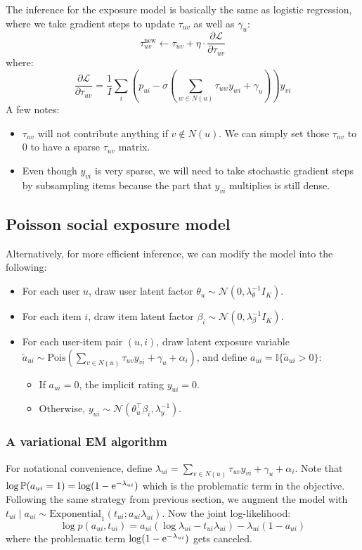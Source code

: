 The inference for the exposure model is basically the same as logistic regression, where we take gradient steps to update $\tau_{uv}$ as well as $\gamma_u$:
\[
\textstyle\tau_{uv}^\text{new} \leftarrow \tau_{uv} + \eta \cdot \frac{\partial \mathcal{L}}{\partial \tau_{uv}}
\]
where:
\[
\textstyle\frac{\partial \mathcal{L}}{\partial \tau_{uv}} = \frac{1}{I}\sum_i (p_{ui} - \sigma(\sum_{w\in N(u)} \tau_{uw} y_{wi} + \gamma_u)) y_{vi}
\] 
A few notes:
\begin{itemize}
\item $\tau_{uv}$ will not contribute anything if $v \notin N(u)$. We can simply set those $\tau_{uv}$ to $0$ to have a sparse $\tau_{uv}$ matrix.
\item Even though $y_{vi}$ is very sparse, we will need to take stochastic gradient steps by subsampling items because the part that $y_{vi}$ multiplies is still dense. 
\end{itemize}

\subsection*{Poisson social exposure model} Alternatively, for more efficient inference, we can modify the model into the following:
\begin{itemize}
\item For each user $u$, draw user latent factor $\theta_{u} \sim \mathcal{N}(0, \lambda_\theta^{-1} I_K)$.
\item For each item $i$, draw item latent factor $\beta_{i} \sim \mathcal{N}(0, \lambda_\beta^{-1} I_K)$.
\item For each user-item pair $(u, i)$, draw latent exposure variable $\tilde{a}_{ui} \sim \text{Pois}(\sum_{v\in N(u)} \tau_{uv} y_{vi} + \gamma_u + \alpha_i)$, and define $a_{ui} = \mathbb{I}\{\tilde{a}_{ui} > 0\}$:
\begin{itemize}
\item If $a_{ui} = 0$, the implicit rating $y_{ui} = 0$.
\item Otherwise, $y_{ui} \sim \mathcal{N}(\theta_u^\top\beta_i, \lambda_y^{-1})$.
\end{itemize}
\end{itemize}

\subsubsection*{A variational EM algorithm}
For notational convenience, define $\lambda_{ui} = \sum_{v\in N(u)} \tau_{uv} y_{vi} + \gamma_u + \alpha_i$. Note that $\log \mathbb{P}(a_{ui} = 1) = \log (1 - \mathrm{e}^{-\lambda_{ui}})$ which is the problematic term in the objective. Following the same strategy from previous section, we augment the model with $t_{ui} \mid a_{ui} \sim \text{Exponential}_1(t_{ui}; a_{ui}\lambda_{ui})$. Now the joint log-likelihood:
\[
\log p(a_{ui}, t_{ui}) = a_{ui} (\log \lambda_{ui} - t_{ui} \lambda_{ui}) - \lambda_{ui}(1 - a_{ui})
\]
where the problematic term $\log (1 - \mathrm{e}^{-\lambda_{ui}})$ gets canceled.

